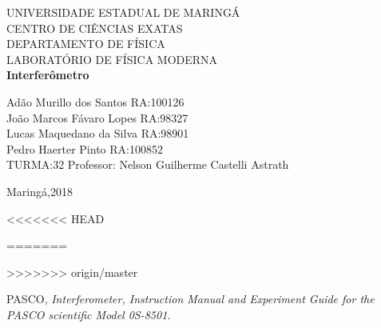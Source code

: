 \documentclass[a4paper,10pt]{article}
\begin{document}
	
	\begin{titlepage}
		\begin{center}
		{\large UNIVERSIDADE ESTADUAL DE MARINGÁ}\\[0.2cm]
		{\large CENTRO DE CIÊNCIAS EXATAS}\\[0.2cm]
		{\large DEPARTAMENTO DE FÍSICA}\\[0.2cm]
		{\large LABORATÓRIO DE FÍSICA MODERNA}\\[7.0cm]
		{\bf \huge Interferômetro}\\[7.0cm]
		\end{center}
	{\large Adão Murillo dos Santos \hfill RA:100126}\\[0.7cm]
	{\large João Marcos Fávaro Lopes \hfill RA:98327}\\[0.7cm]
	{\large Lucas Maquedano da Silva \hfill RA:98901}\\[0.7cm]
	{\large Pedro Haerter Pinto \hfill RA:100852}\\[0.7cm]
	{\large TURMA:32 \hfill Professor: Nelson Guilherme Castelli
	Astrath}
	
	\vfill
		\begin{center}
		{\large Maringá,2018}
		\end{center}
	\end{titlepage}

	\tableofcontents
<<<<<<< HEAD
	
=======
	
>>>>>>> origin/master
	
		
	
\vspace{3cm}
	\begin{thebibliography}{1}
    	PASCO, \it{Interferometer}, Instruction Manual and Experiment Guide for the PASCO scientific Model 0S-8501.
	\end{thebibliography}	
	
\end{document}
